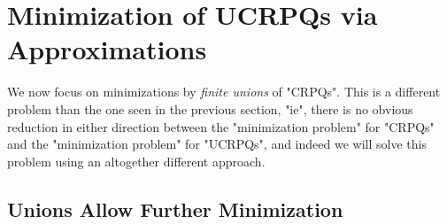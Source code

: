 \section{Minimization of UCRPQs via Approximations}
\label{sec:ucrpqs}

\AP\label{sec:upperUCRPQ}
We now focus on minimizations by \emph{finite unions} of "CRPQs". This is a different problem than the one seen in the previous section, "ie", there is no obvious reduction in either direction between the "minimization problem" for "CRPQs" and the "minimization problem" for "UCRPQs", and indeed we will solve this problem using an altogether different approach. 


\subsection{Unions Allow Further Minimization}

